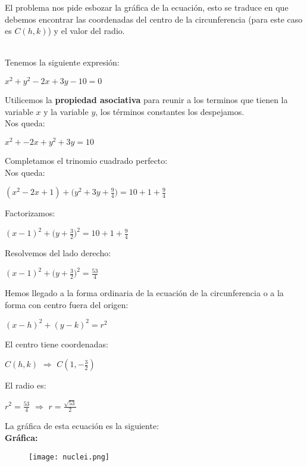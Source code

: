 \documentclass[12pt]{article}
\begin{document}
El problema nos pide esbozar la gráfica de la ecuación, esto se traduce en que debemos encontrar las coordenadas del centro de la circunferencia (para este caso es $C(h,k)$) y el valor del radio.

{}\\

Tenemos la siguiente expresión:

\begin{center}
     $x^{2}+y^{2}-2x+3y-10=0$
\end{center}

Utilicemos la \textbf{propiedad asociativa} para reunir a los terminos que tienen la variable $x$ y la variable $y$, los términos constantes los despejamos.\\

Nos queda:

\begin{center}
     $x^{2}+-2x+y^{2}+3y=10$
\end{center}

Completamos el trinomio cuadrado perfecto:\\

Nos queda:

\begin{center}
     $(x^{2}-2x+1)+(y^{2}+3y+{\frac{9}{4})}=10+1+\frac{9}{4}$
\end{center}

Factorizamos:

\begin{center}
     $(x-1)^{2}+(y+{\frac{3}{2})^{2}}=10+1+\frac{9}{4}$
\end{center}

Resolvemos del lado derecho:

\begin{center}
     $(x-1)^{2}+(y+{\frac{3}{2})^{2}}=\frac{53}{4}$
\end{center}

Hemos llegado a la forma ordinaria de la ecuación de la circunferencia o a la forma con centro fuera del origen:

\begin{center}
     $(x-h)^{2}+(y-k)^{2}=r^{2}$
\end{center}

El centro tiene coordenadas:

\begin{center}
   $C(h,k)$  $\Rightarrow$ $C(1,-\frac{3}{2})$
\end{center}

El radio es:

\begin{center}
   $r^{2}=\frac{53}{4}$  $\Rightarrow$ $r=\frac{\sqrt{53}}{2}$
\end{center}

\newpage
La gráfica de esta ecuación es la siguiente: \\

\textbf{Gráfica:}
\begin{figure}[htb] \centering \texttt{[image: nuclei.png]} \end{figure}
\end{document}
